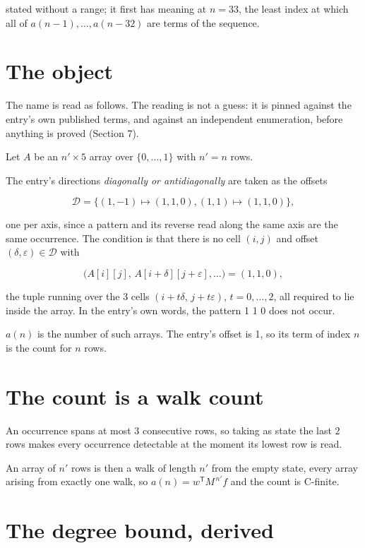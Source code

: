 \documentclass[11pt]{article}
\theoremstyle{definition}
\begin{document}
stated without a range; it first has meaning at $n = 33$, the least index at which all of $a(n-1),\dots,a(n-32)$ are terms of the sequence.

\section{The object}

The name is read as follows. The reading is not a guess: it is pinned against the entry's own published terms, and against an independent enumeration, before anything is proved (Section 7).

Let $A$ be an $n' \times 5$ array over $\{0,\dots,1\}$ with $n' = n$ rows.

The entry's directions {\itshape diagonally or antidiagonally} are taken as the offsets

\[\mathcal{D} = \{(1,-1)\mapsto(1,1,0), (1,1)\mapsto(1,1,0)\},\]

one per axis, since a pattern and its reverse read along the same axis are the same occurrence. The condition is that there is no cell $(i,j)$ and offset $(\delta,\varepsilon)\in\mathcal{D}$ with

\[\bigl(A[i][j],\,A[i{+}\delta][j{+}\varepsilon],\dots\bigr) = (1, 1, 0),\]

the tuple running over the $3$ cells $(i+t\delta,\,j+t\varepsilon)$, $t = 0,\dots,2$, all required to lie inside the array. In the entry's own words, the pattern 1 1 0 does not occur.

$a(n)$ is the number of such arrays. The entry's offset is 1, so its term of index $n$ is the count for $n$ rows.

\section{The count is a walk count}

An occurrence spans at most $3$ consecutive rows, so taking as state the last $2$ rows makes every occurrence detectable at the moment its lowest row is read.

An array of $n'$ rows is then a walk of length $n'$ from the empty state, every array arising from exactly one walk, so $a(n) = w^{\mathsf T}M^{\,n'}f$ and the count is C-finite.

\section{The degree bound, derived}
\end{document}
